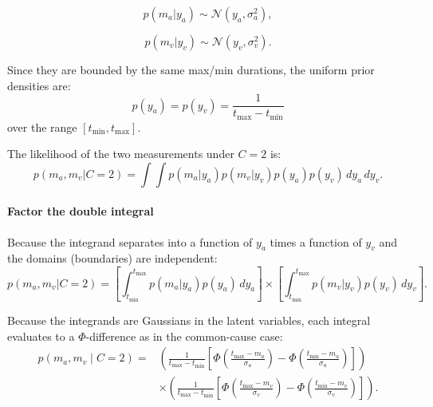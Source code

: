 \documentclass[9pt,lineno,doublespacing]{elife}
\begin{document}
\begin{equation}
p(m_a | y_a) \sim \mathcal{N}(y_a, \sigma_a^2),
\end{equation}

\begin{equation}
p(m_v | y_v) \sim \mathcal{N}(y_v, \sigma_v^2).
\end{equation}

Since they are bounded by the same max/min durations, the uniform prior densities are:
\begin{equation}
p(y_a) = p(y_v) = \frac{1}{t_{\max} - t_{\min}}
\end{equation}
over the range $[t_{\min}, t_{\max}]$.

The likelihood of the two measurements under $C=2$ is:
\begin{equation}
p(m_a, m_v | C=2) = \int \int p(m_a | y_a) p(m_v | y_v) p(y_a) p(y_v) \, dy_a \, dy_v.
\end{equation}

\paragraph{Factor the double integral}

Because the integrand separates into a function of $y_a$ times a function of $y_v$ and the domains (boundaries) are independent:
\begin{equation}
p(m_a, m_v | C=2) = \left[\int_{t_{\min}}^{t_{\max}} p(m_a | y_a) p(y_a) \, dy_a\right] 
\times \left[\int_{t_{\min}}^{t_{\max}} p(m_v | y_v) p(y_v) \, dy_v\right].
\end{equation}

Because the integrands are Gaussians in the latent variables, each integral evaluates to a $\Phi$-difference as in the common-cause case:
\begin{align}
\label{eq:likelihood_c2_final}
p(m_a, m_v \mid C\!=\!2)
= &\left(\frac{1}{t_{\max} - t_{\min}} \left[\Phi\!\left(\frac{t_{\max} - m_a}{\sigma_a}\right) - \Phi\!\left(\frac{t_{\min} - m_a}{\sigma_a}\right)\right]\right) \\
 &\times \left(\frac{1}{t_{\max} - t_{\min}} \left[\Phi\!\left(\frac{t_{\max} - m_v}{\sigma_v}\right) - \Phi\!\left(\frac{t_{\min} - m_v}{\sigma_v}\right)\right]\right).
\end{align}

\end{document}
